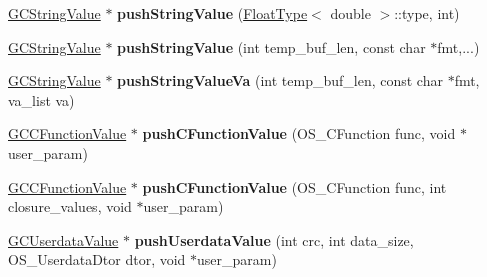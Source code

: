 \begin{DoxyCompactItemize}
\item 
\hyperlink{struct_object_script_1_1_o_s_1_1_core_1_1_g_c_string_value}{G\+C\+String\+Value} $\ast$ {\bfseries push\+String\+Value} (\hyperlink{struct_object_script_1_1_float_type}{Float\+Type}$<$ double $>$\+::type, int)\hypertarget{class_object_script_1_1_o_s_1_1_core_abc94f76f83254ad7487fa82147943dbd}{}\label{class_object_script_1_1_o_s_1_1_core_abc94f76f83254ad7487fa82147943dbd}

\item 
\hyperlink{struct_object_script_1_1_o_s_1_1_core_1_1_g_c_string_value}{G\+C\+String\+Value} $\ast$ {\bfseries push\+String\+Value} (int temp\+\_\+buf\+\_\+len, const char $\ast$fmt,...)\hypertarget{class_object_script_1_1_o_s_1_1_core_ad3dd8e7164c831de0c294b1be0c8c508}{}\label{class_object_script_1_1_o_s_1_1_core_ad3dd8e7164c831de0c294b1be0c8c508}

\item 
\hyperlink{struct_object_script_1_1_o_s_1_1_core_1_1_g_c_string_value}{G\+C\+String\+Value} $\ast$ {\bfseries push\+String\+Value\+Va} (int temp\+\_\+buf\+\_\+len, const char $\ast$fmt, va\+\_\+list va)\hypertarget{class_object_script_1_1_o_s_1_1_core_a3126d248cb580da56d6054f32d1874d6}{}\label{class_object_script_1_1_o_s_1_1_core_a3126d248cb580da56d6054f32d1874d6}

\item 
\hyperlink{struct_object_script_1_1_o_s_1_1_core_1_1_g_c_c_function_value}{G\+C\+C\+Function\+Value} $\ast$ {\bfseries push\+C\+Function\+Value} (O\+S\+\_\+\+C\+Function func, void $\ast$user\+\_\+param)\hypertarget{class_object_script_1_1_o_s_1_1_core_a45f1936e19606a24894c2f926d40ab2e}{}\label{class_object_script_1_1_o_s_1_1_core_a45f1936e19606a24894c2f926d40ab2e}

\item 
\hyperlink{struct_object_script_1_1_o_s_1_1_core_1_1_g_c_c_function_value}{G\+C\+C\+Function\+Value} $\ast$ {\bfseries push\+C\+Function\+Value} (O\+S\+\_\+\+C\+Function func, int closure\+\_\+values, void $\ast$user\+\_\+param)\hypertarget{class_object_script_1_1_o_s_1_1_core_ab4efd4b162561abad52394cfce7d402f}{}\label{class_object_script_1_1_o_s_1_1_core_ab4efd4b162561abad52394cfce7d402f}

\item 
\hyperlink{struct_object_script_1_1_o_s_1_1_core_1_1_g_c_userdata_value}{G\+C\+Userdata\+Value} $\ast$ {\bfseries push\+Userdata\+Value} (int crc, int data\+\_\+size, O\+S\+\_\+\+Userdata\+Dtor dtor, void $\ast$user\+\_\+param)\hypertarget{class_object_script_1_1_o_s_1_1_core_a3b55c174a89753211e108a6102f79206}{}\label{class_object_script_1_1_o_s_1_1_core_a3b55c174a89753211e108a6102f79206}


\end{DoxyCompactItemize}
